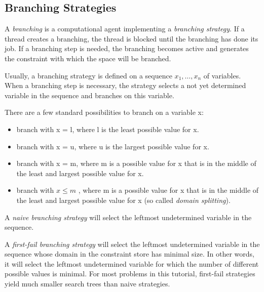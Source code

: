 \documentclass[a4paper]{scrartcl}
\begin{document}
\subsection{Branching Strategies}
A {\it branching} is a computational agent implementing 
a {\it branching strategy}. If a thread 
creates a branching, the thread is blocked until the 
branching has done its job. If a 
branching step is needed, the branching becomes 
active and generates the constraint 
with which the space will be branched.\\
\par
Usually, a branching strategy is defined on a sequence 
$ x_1,\ldots,x_n $ of variables. When a 
branching step is necessary, the strategy selects a not 
yet determined variable in the sequence 
and branches on this variable.\\
\par
There are a few standard possibilities to branch on a 
variable x:
\begin{itemize}
\item
branch with x = l, where l is the least possible value 
for x.
\item
branch with x = u, where u is the largest possible 
value for x.
\item
branch with x = m, where m is a possible value for 
x that is in the middle of the least and 
largest possible value for x.
\item
branch with $ x \le m$ , where m is a possible 
value for x that is in the middle of the 
least and largest possible value for x (so called 
{\it domain splitting}).\\
\end{itemize}
\par
A {\it naive branching strategy} will select the 
leftmost undetermined variable in the sequence.\\
\par
A {\it first-fail branching strategy} will select 
the leftmost undetermined variable in the 
sequence whose domain in the constraint store has minimal 
size. In other words, it will select 
the leftmost undetermined variable for which the number 
of different possible values is minimal.
For most problems in this tutorial,
first-fail strategies yield much smaller 
search trees than naive strategies.
\end{document}
